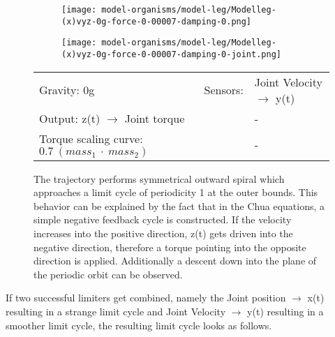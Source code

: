 \documentclass[main]{subfiles}
\begin{document}
\begin{figure}[H]
	\centering
\begin{subfigure}[c]{0.45\textwidth}
	\texttt{[image: model-organisms/model-leg/Modelleg-(x)vyz-0g-force-0-00007-damping-0.png]}
		\end{subfigure}
	\begin{subfigure}[c]{0.45\textwidth}
	\texttt{[image: model-organisms/model-leg/Modelleg-(x)vyz-0g-force-0-00007-damping-0-joint.png]}
		\end{subfigure}
	\caption[Joint Velocity \(\rightarrow\) y(t) limited chaotic controller controlling model leg]{The trajectory performs symmetrical outward spiral which approaches a limit cycle of periodicity 1 at the outer bounds. This behavior can be explained by the fact that in the Chua equations, a simple negative feedback cycle is constructed. If the velocity increases into the positive direction, z(t) gets driven into the negative direction, therefore a torque pointing into the opposite direction is applied. Additionally a descent down into the plane of the periodic orbit can be observed.}
	\begin{tabular}{l|ll}
	\hline 
	Gravity: 0g  & Sensors: & Joint Velocity \(\rightarrow\) y(t)\\
	 Output: z(t) \(\rightarrow\) Joint torque &  & - \\
	  Torque scaling curve: \(0.7~(mass_1~\cdot~mass_2)\) & & - \\
	  \hline
	\end{tabular}

	\label{figure:limited-model-leg4}
\end{figure}

If two successful limiters get combined, namely the Joint position \(\rightarrow\) x(t) resulting in a strange limit cycle and Joint Velocity \(\rightarrow\) y(t) resulting in a smoother limit cycle, the resulting limit cycle looks as follows.
\end{document}
